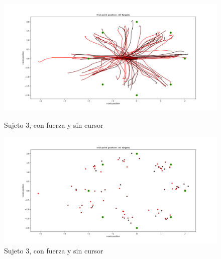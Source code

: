 \documentclass[a4paper,11pt, oneside]{book}
\begin{document}
\begin{figure}[H]
	\begin{minipage}[b]{0.5\linewidth}
		\centering
		\includegraphics[width=\linewidth]{sujeto3/force_no_cursor/trayectorias}
		\caption{Sujeto 3, con fuerza y sin cursor}
		\label{3-fase4-1}
	\end{minipage}
	\hspace{0.5cm}
	\begin{minipage}[b]{0.5\linewidth}
		\centering
		\includegraphics[width=\linewidth]{sujeto3/force_no_cursor/trayectorias_puntos}
		\caption{Sujeto 3, con fuerza y sin cursor}
		\label{3-fase4-2}
	\end{minipage}
\end{figure}
\end{document}
